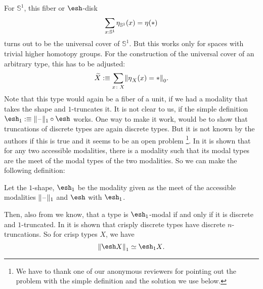 \documentclass[9pt,twosided]{amsart}
\newcommand{\shape}{\ensuremath{\mathord{\raisebox{0.5pt}{\text{\rm\esh}}}}}
\newcommand{\bS}{\mathbb S}
\begin{document}
For $\bS^{1}$, this fiber or $\shape$-disk
\[ \sum_{x:\bS^{1}}\modalunit_{\bS^{1}}(x)=\modalunit(\ast) \]
turns out to be the universal cover of $\bS^{1}$.
But this works only for spaces with trivial higher homotopy groups. 
For the construction of the universal cover of an arbitrary type, this has to be adjusted:
\[ \widetilde{X}:\equiv \sum_{x\colon X} \trunc{0}{\modalunit_X(x)=\ast}. \]
Note that this type would again be a fiber of a unit, if we had a modality that takes the shape and $1$-truncates it.
It is not clear to us, if the simple definition $\shape_1:\equiv\trunc{1}{\blank}\circ\shape$ works.
One way to make it work, would be to show that truncations of discrete types are again discrete types.
But it is not known by the authors if this is true and it seems to be an open problem
\footnote{We have to thank one of our anonymous reviewers for pointing out the problem with the simple definition and the solution we use below.}.
In \cite[Theorem 3.28]{RijkeSpittersShulman} it is shown that for any two accessible modalities,
there is a modality such that its modal types are the meet of the modal types of the two modalities.
So we can make the following definition:
\begin{defn}
Let the $1$-shape, $\shape_1$ be the modality given as the meet of the accessible modalities $\trunc{1}{\blank}$ and $\shape$ with $\shape_1$.
\end{defn}
Then, also from \cite{RijkeSpittersShulman} we know, that a type is $\shape_1$-modal if and only if it is discrete and $1$-truncated.
In \cite[Theorem 6.21]{ShulmanRealCohesion} it is shown that crisply discrete types have discrete $n$-truncations.
So for crisp types $X$, we have
\[ \trunc{1}{\shape X} \simeq \shape_1 X\text{.} \]
\end{document}
